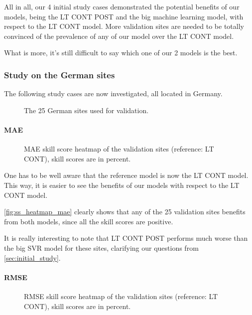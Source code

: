 All in all, our 4 initial study cases demonstrated the potential benefits of our models, being the LT CONT POST and the big machine learning model, with respect to the LT CONT model.
More validation sites are needed to be totally convinced of the prevalence of any of our model over the LT CONT model.

What is more, it's still difficult to say which one of our 2 models is the best.
\newpage
\subsubsection{Study on the German sites}

The following study cases are now investigated, all located in Germany.
\begin{figure}[htb!]
    \centering
    
\caption{The 25 German sites used for validation.}

\end{figure}
\newpage
\paragraph{MAE}\indent
\begin{figure}[htb!]
    \centering
    
\caption{MAE skill score heatmap of the validation sites (reference: LT CONT), skill scores are in percent.}
\label{fig:ss_heatmap_mae}
\end{figure}

One has to be well aware that the reference model is now the LT CONT model. This way, it is easier to see the benefits of our models with respect to the LT CONT model.

\autoref{fig:ss_heatmap_mae} clearly shows that any of the 25 validation sites benefits from both models, since all the skill scores are positive.

It is really interesting to note that LT CONT POST performs much worse than the big SVR model for these sites, clarifying our questions from \ref{sec:initial_study}.
\newpage

\paragraph{RMSE}\indent
\begin{figure}[htb!]
    \centering
    
\caption{RMSE skill score heatmap of the validation sites (reference: LT CONT), skill scores are in percent.}
\end{figure}

